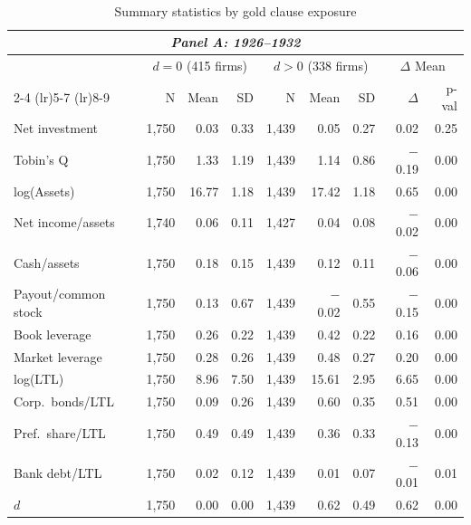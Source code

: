\begin{table}[p]\centering
    \caption{\\ Summary statistics by gold clause exposure}
    \scriptsize
    \label{tab:sum_stats_d}
    
    \begin{threeparttable}
        \begin{tabular}{l rrr rrr rr}
            \toprule
            \multicolumn{9}{c}{\textit{Panel A: 1926--1932}} \\
            \midrule
             & \multicolumn{3}{c}{$d = 0$ (415 firms)} & \multicolumn{3}{c}{$d > 0$ (338 firms)} & \multicolumn{2}{c}{$\Delta$ Mean} \\
            \cmidrule(lr){2-4} \cmidrule(lr){5-7} \cmidrule(lr){8-9}
             & N & Mean & SD & N & Mean & SD & $\Delta$ & p-val \\
            Net investment & 1,750 & 0.03 & 0.33 & 1,439 & 0.05 & 0.27 & 0.02 & 0.25 \\
            Tobin's Q & 1,750 & 1.33 & 1.19 & 1,439 & 1.14 & 0.86 & $-$0.19 & 0.00 \\
            log(Assets) & 1,750 & 16.77 & 1.18 & 1,439 & 17.42 & 1.18 & 0.65 & 0.00 \\
            Net income/assets & 1,740 & 0.06 & 0.11 & 1,427 & 0.04 & 0.08 & $-$0.02 & 0.00 \\
            Cash/assets & 1,750 & 0.18 & 0.15 & 1,439 & 0.12 & 0.11 & $-$0.06 & 0.00 \\
            Payout/common stock & 1,750 & 0.13 & 0.67 & 1,439 & $-$0.02 & 0.55 & $-$0.15 & 0.00 \\
            Book leverage & 1,750 & 0.26 & 0.22 & 1,439 & 0.42 & 0.22 & 0.16 & 0.00 \\
            Market leverage & 1,750 & 0.28 & 0.26 & 1,439 & 0.48 & 0.27 & 0.20 & 0.00 \\
            log(LTL) & 1,750 & 8.96 & 7.50 & 1,439 & 15.61 & 2.95 & 6.65 & 0.00 \\
            Corp.\ bonds/LTL & 1,750 & 0.09 & 0.26 & 1,439 & 0.60 & 0.35 & 0.51 & 0.00 \\
            Pref.\ share/LTL & 1,750 & 0.49 & 0.49 & 1,439 & 0.36 & 0.33 & $-$0.13 & 0.00 \\
            Bank debt/LTL & 1,750 & 0.02 & 0.12 & 1,439 & 0.01 & 0.07 & $-$0.01 & 0.01 \\
            \ensuremath{d} & 1,750 & 0.00 & 0.00 & 1,439 & 0.62 & 0.49 & 0.62 & 0.00 \\
            \midrule

\end{tabular}
\end{threeparttable}
\end{table}
